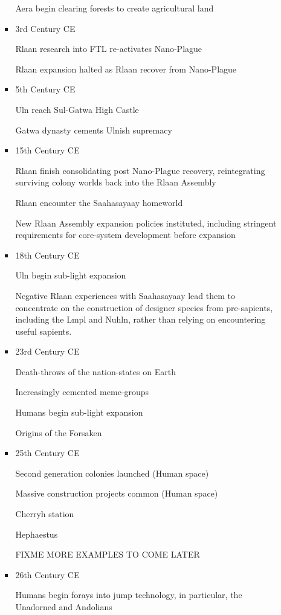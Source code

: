 \begin{itemize}
\begin{itemize}
\begin{itemize}
Aera begin clearing forests to create agricultural land 
\item	3rd Century CE 

Rlaan research into FTL re-activates Nano-Plague 

Rlaan expansion halted as Rlaan recover from Nano-Plague 

\item	5th Century CE 

Uln reach Sul-Gatwa High Castle 

Gatwa dynasty cements Ulnish supremacy 

\item	15th Century CE 

Rlaan finish consolidating post Nano-Plague recovery, reintegrating
surviving colony worlds back into the Rlaan Assembly

Rlaan encounter the Saahasayaay homeworld 

New Rlaan Assembly expansion policies instituted, including stringent requirements for core-system development before expansion 

\item	18th Century CE 

Uln begin sub-light expansion 

Negative Rlaan experiences with Saahasayaay lead them to concentrate
on the construction of designer species from pre-sapients, including
the Lmpl and Nuhln, rather than relying on encountering useful
sapients.

\item	23rd Century CE 

Death-throws of the nation-states on Earth 

Increasingly cemented meme-groups 

Humans begin sub-light expansion 

Origins of the Forsaken 

\item	25th Century CE 

Second generation colonies launched (Human space) 

Massive construction projects common (Human space) 

Cherryh station 

Hephaestus 

FIXME MORE EXAMPLES TO COME LATER 
\item	26th Century CE 

Humans begin forays into jump technology, in particular, the Unadorned
and Andolians


\end{itemize}
\end{itemize}
\end{itemize}

